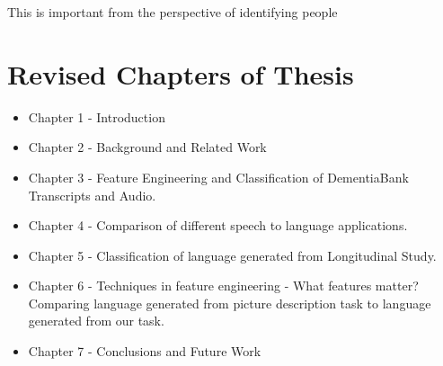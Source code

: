 \documentclass[11pt]{article}
\begin{document}
This is important from the perspective of identifying people 




\section{Revised Chapters of Thesis}
\begin{itemize}
	\item Chapter 1 - Introduction
	\item Chapter 2 - Background and Related Work
	\item Chapter 3 - Feature Engineering and Classification of DementiaBank Transcripts and Audio.
	\item Chapter 4 - Comparison of different speech to language applications.
	\item Chapter 5 - Classification of language generated from Longitudinal Study.
	\item Chapter 6 - Techniques in feature engineering - What features matter? Comparing language generated from picture description task to language generated from our task.
	\item Chapter 7 - Conclusions and Future Work
\end{itemize}
\end{document}

